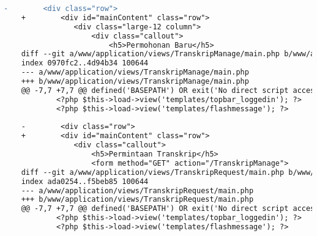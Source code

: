 \begin{lstlisting}[frame=single, label={lst:perbaikan_2.4.1_bypass_blocks}, language=diff, caption=Perbaikan Kriteria Sukses 2.4.1 - Mekanisme untuk Melompati Area Konten yang Berulang]
    -        <div class="row">
    +        <div id="mainContent" class="row">
                <div class="large-12 column">
                    <div class="callout">
                        <h5>Permohonan Baru</h5>
    diff --git a/www/application/views/TranskripManage/main.php b/www/application/views/TranskripManage/main.php
    index 0970fc2..4d94b34 100644
    --- a/www/application/views/TranskripManage/main.php
    +++ b/www/application/views/TranskripManage/main.php
    @@ -7,7 +7,7 @@ defined('BASEPATH') OR exit('No direct script access allowed');
            <?php $this->load->view('templates/topbar_loggedin'); ?>
            <?php $this->load->view('templates/flashmessage'); ?>
    
    -        <div class="row">
    +        <div id="mainContent" class="row">
                <div class="callout">
                    <h5>Permintaan Transkrip</h5>
                    <form method="GET" action="/TranskripManage">
    diff --git a/www/application/views/TranskripRequest/main.php b/www/application/views/TranskripRequest/main.php
    index ada0254..f5beb85 100644
    --- a/www/application/views/TranskripRequest/main.php
    +++ b/www/application/views/TranskripRequest/main.php
    @@ -7,7 +7,7 @@ defined('BASEPATH') OR exit('No direct script access allowed');
            <?php $this->load->view('templates/topbar_loggedin'); ?>
            <?php $this->load->view('templates/flashmessage'); ?>
    

\end{lstlisting}
